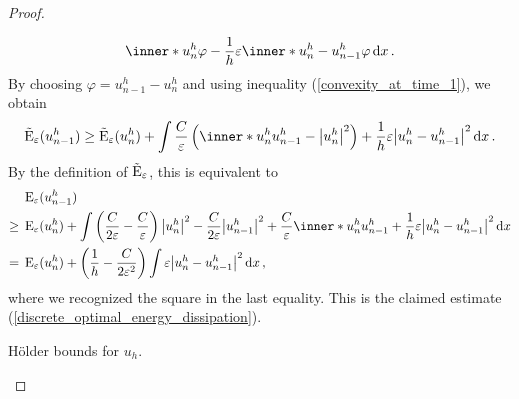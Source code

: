 \begin{proof}
\begin{description}[wide=0pt]
\begin{align*}
			\inner*{u_{ n }^{ h }}{\varphi}
			-
			\frac{ 1 }{ h }
			\varepsilon
			\inner*{ u_{ n }^{ h } - u_{ n - 1 } ^{ h } }{ \varphi }
			\dd{x}.
		\end{align*}
		By choosing $ \varphi = u_{ n - 1 }^{ h } - u_{ n }^{ h } $ 
		and using inequality (\ref{convexity_at_time_1}), we obtain
		\begin{equation*}
			\tilde{\energy}_{ \varepsilon } ( u_{ n - 1 }^{ h } ) 
			\geq
			\tilde{\energy}_{ \varepsilon} ( u_{ n }^{ h } )
			+
			\int
			\frac{ C }{ \varepsilon } 
			\left(
			\inner*{ u_{n }^{ h }}{ u_{ n - 1 }^{ h } }
			-
			\abs{ u_{ n }^{ h }}^{ 2 }
			\right)
			+
			\frac{ 1 }{ h }
			\varepsilon
			\abs{ u_{n }^{ h } - u_{ n -1 }^{ h } }^{ 2 }
			\dd{ x }.
		\end{equation*}
		By the definition of $ \tilde{ \operatorname{E} }_{ \varepsilon }  $, this is 
		equivalent to
		\begin{align*}
			& \energy_{ \varepsilon } (u_{ n - 1 }^{ h } )
			\\
			\geq {} &
			\energy_{ \varepsilon } (u_{ n }^{ h } ) +
			\int
			\left(
			\frac{ C }{ 2 \varepsilon }
			-
			\frac{ C }{ \varepsilon }
			\right)
			\abs{ u_{ n }^{ h } }^{ 2 }
			-
			\frac{ C }{ 2 \varepsilon }
			\abs{ u_{n - 1 }^{ h } }^{ 2 }
			+ 
			\frac{ C }{ \varepsilon }
			\inner*{ u_{ n }^{ h } }{ u_{ n - 1 }^{ h } }
			+ 
			\frac{ 1 }{ h }
			\varepsilon
			\abs{ u_{ n }^{ h } - u_{ n - 1 }^{ h } }^{ 2 }
			\dd{ x }
			\\
			= {} &
			\energy_{ \varepsilon } ( u_{n }^{ h } )
			+
			\left( 
			\frac{ 1 }{ h }
			- 
			\frac{ C }{ 2 \varepsilon^{ 2 } }
			\right)
			\int 
			\varepsilon \abs{ u_{n }^{ h } - u_{ n - 1 }^{ h } }^{ 2 }
			\dd{ x },
		\end{align*}
		where we recognized the square in the last equality.
		This is the claimed estimate 
		(\ref{discrete_optimal_energy_dissipation}).
		
		\item[Step 4:] Hölder bounds for $ u_{ h } $.
		

\end{description}
\end{proof}
